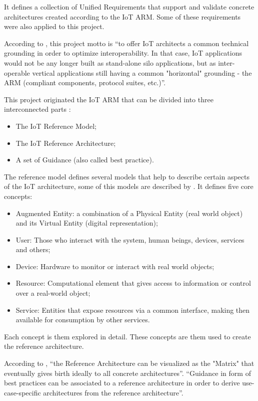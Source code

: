 It defines a collection of Unified Requirements that support and validate concrete architectures created according to the \gls{IoT} \gls{ARM}. Some of these requirements were also applied to this project.

According to \cite{krvco2014designing}, this project motto is ``to offer IoT architects a common technical grounding in order to optimize interoperability. In that case, IoT applications would not be any longer built as stand-alone silo applications, but as inter-operable vertical applications still having a common "horizontal" grounding - the \gls{ARM} (compliant components, protocol suites, etc.)''.

This project originated the \gls{IoT} \gls{ARM} that can be divided into three interconnected parts \parencite{krvco2014designing}:

\begin{itemize}
    \item The IoT Reference Model;
    \item The IoT Reference Architecture;
    \item A set of Guidance (also called best practice).
\end{itemize}

The reference model defines several models that help to describe certain aspects of the \gls{IoT} architecture, some of this models are described by \cite{6682101}. It defines five core concepts:

\begin{itemize}
    \item Augmented Entity: a combination of a Physical Entity (real world object) and its Virtual Entity (digital representation);
    \item User: Those who interact with the system, human beings, devices, services and others;
    \item Device: Hardware to monitor or interact with real world objects;
    \item Resource: Computational element that gives access to information or control over a real-world object;
    \item Service: Entities that expose resources via a common interface, making then available for consumption by other services.
\end{itemize}

Each concept is them explored in detail. These concepts are them used to create the reference architecture.

According to , ``the Reference Architecture can be visualized as the "Matrix" that eventually gives birth ideally to all concrete architectures''. ``Guidance in form of best practices can be associated to a reference architecture in order to derive use-case-specific architectures from the reference architecture''.


